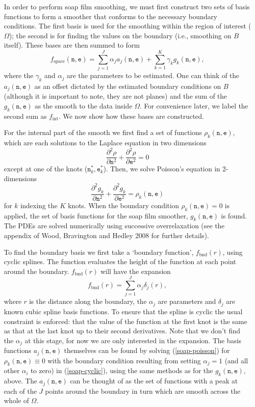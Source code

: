 \documentclass[10pt]{article}
\newcommand{\beq}{\begin{equation}}
\newcommand{\eeq}{\end{equation}}
\theoremstyle{definition}
\theoremstyle{plain}
\begin{document}
In order to perform soap film smoothing, we must first construct two sets of basis functions to form a smoother that conforms to the necessary boundary conditions. The first basis is used for the smoothing within the region of interest ($\Omega$); the second is for finding the values on the boundary (i.e., smoothing on $B$ itself). These bases are then summed to form
\beq
f_\text{space}(\texttt{n},\texttt{e})=\sum_{j=1}^J \alpha_j a_j(\texttt{n},\texttt{e}) + \sum_{k=1}^K \gamma_k g_k(\texttt{n},\texttt{e}),
\eeq
where the $\gamma_k$ and $\alpha_j$ are the parameters to be estimated. One can think of the $a_j(\texttt{n},\texttt{e})$ as an offset dictated by the estimated boundary conditions on $B$ (although it is important to note, they are not planes) and the sum of the $g_k(\texttt{n},\texttt{e})$ as the smooth to the data inside $\Omega$. For convenience later, we label the second sum as $f_\text{int}$. We now show how these bases are constructed.

For the internal part of the smooth we first find a set of functions $\rho_k(\texttt{n},\texttt{e})$, which are each solutions to the Laplace equation in two dimensions
\beq
\frac{\partial^2\rho}{\partial \texttt{n}^2} + \frac{\partial^2\rho}{\partial \texttt{e}^2} = 0
\eeq
except at one of the knots ($\texttt{n}^*_k,\texttt{e}^*_k$). Then, we solve Poisson's equation in 2-dimensions
\beq
\frac{\partial^2 g_k}{\partial \texttt{n}^2} + \frac{\partial^2 g_k}{\partial \texttt{e}^2} = \rho_k(\texttt{n},\texttt{e})
\label{soap-poisson}
\eeq
for $k$ indexing the $K$ knots. When the boundary condition $\rho_k(\texttt{n},\texttt{e})=0$ is applied, the set of basis functions for the soap film smoother, $g_k(\texttt{n},\texttt{e})$ is found.  The PDEs are solved numerically using successive overrelaxation (see the appendix of Wood, Bravington and Hedley 2008 for further details).

To find the boundary basis we first take a `boundary function', $f_\text{bnd}(r)$, using cyclic splines. The function evaluates the height of the function at each point around the boundary. $f_\text{bnd}(r)$ will have the expansion
\beq
f_\text{bnd}(r)=\sum_{j=1}^J \alpha_j \delta_j(r),
\label{soap-cyclic}
\eeq
where $r$ is the distance along the boundary, the $\alpha_j$ are parameters and $\delta_j$ are known cubic spline basis functions. To ensure that the spline is cyclic the usual constraint is enforced: that the value of the function at the first knot is the same as that at the last knot up to their second derivatives. Note that we don't find the $\alpha_j$ at this stage, for now we are only interested in the expansion. The basis functions $a_j(\texttt{n},\texttt{e})$ themselves can be found by solving (\ref{soap-poisson}) for $\rho_k(\texttt{n},\texttt{e})\equiv 0$ with the boundary condition resulting from setting $\alpha_j=1$ (and all other $\alpha_i$ to zero) in (\ref{soap-cyclic}), using the same methods as for the $g_k(\texttt{n},\texttt{e})$, above. The $a_j(\texttt{n},\texttt{e})$ can be thought of as the set of functions with a peak at each of the $J$ points around the boundary in turn which are smooth across the whole of $\Omega$.
\end{document}
